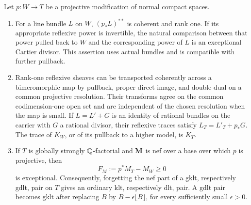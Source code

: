 \begin{lemma}\label{lem:trace}
Let $p\colon W\to T$ be a projective modification of normal compact
spaces.
\begin{enumerate}[label=\textup{(\roman*)}]
\item For a line bundle $L$ on $W$, $(p_*L)^{**}$ is coherent and
rank one.  If its appropriate reflexive power is invertible, the natural
comparison between that power pulled back to $W$ and the corresponding
power of $L$ is an exceptional Cartier divisor.  This assertion uses
actual bundles and is compatible with further pullback.
\item Rank-one reflexive sheaves can be transported coherently across
a bimeromorphic map by pullback, proper direct image, and double dual on
a common projective resolution.  Their transforms agree on the common
codimension-one open set and are independent of the chosen resolution
when the map is small.
If $L=L'+G$ is an identity of rational bundles on the carrier with
$G$ a rational divisor, their reflexive traces satisfy
$L_T=L'_T+p_*G$.  The trace of $K_W$, or of its pullback to a higher
model, is $K_T$.
\item If $T$ is globally strongly $\mathbb Q$-factorial and $\mathbf M$ is nef
over a base over which $p$ is projective, then
\begin{equation}\label{eq:nef-trace-defect}
 F_M:=p^*M_T-M_W\geq0
\end{equation}
is exceptional.  Consequently, forgetting the nef part of a gklt,
respectively gdlt, pair on $T$ gives an ordinary klt, respectively dlt,
pair.  A gdlt pair becomes gklt after replacing $B$ by
$B-\epsilon\lfloor B\rfloor$, for every sufficiently small
$\epsilon>0$.
\end{enumerate}
\end{lemma}

